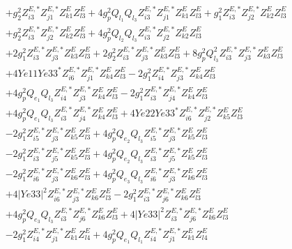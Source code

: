 \begin{align}
 &+g_{2}^{2} Z^{E,*}_{i 3} Z^{E,*}_{j 1} Z_{{k 1}}^{E} Z_{{l 3}}^{E} +4 g_{p}^{2} Q_{l_1} Q_{l_3} Z^{E,*}_{i 3} Z^{E,*}_{j 1} Z_{{k 1}}^{E} Z_{{l 3}}^{E} +g_{1}^{2} Z^{E,*}_{i 3} Z^{E,*}_{j 2} Z_{{k 2}}^{E} Z_{{l 3}}^{E} \nonumber \\ 
 &+g_{2}^{2} Z^{E,*}_{i 3} Z^{E,*}_{j 2} Z_{{k 2}}^{E} Z_{{l 3}}^{E} +4 g_{p}^{2} Q_{l_2} Q_{l_3} Z^{E,*}_{i 3} Z^{E,*}_{j 2} Z_{{k 2}}^{E} Z_{{l 3}}^{E} \nonumber \\ 
 &+2 g_{1}^{2} Z^{E,*}_{i 3} Z^{E,*}_{j 3} Z_{{k 3}}^{E} Z_{{l 3}}^{E} +2 g_{2}^{2} Z^{E,*}_{i 3} Z^{E,*}_{j 3} Z_{{k 3}}^{E} Z_{{l 3}}^{E} +8 g_{p}^{2} Q_{l_3}^{2} Z^{E,*}_{i 3} Z^{E,*}_{j 3} Z_{{k 3}}^{E} Z_{{l 3}}^{E} \nonumber \\ 
 &+4 Ye11 Ye33^* Z^{E,*}_{i 6} Z^{E,*}_{j 1} Z_{{k 4}}^{E} Z_{{l 3}}^{E} -2 g_{1}^{2} Z^{E,*}_{i 4} Z^{E,*}_{j 3} Z_{{k 4}}^{E} Z_{{l 3}}^{E} \nonumber \\ 
 &+4 g_{p}^{2} Q_{e_{1}} Q_{l_3} Z^{E,*}_{i 4} Z^{E,*}_{j 3} Z_{{k 4}}^{E} Z_{{l 3}}^{E} -2 g_{1}^{2} Z^{E,*}_{i 3} Z^{E,*}_{j 4} Z_{{k 4}}^{E} Z_{{l 3}}^{E} \nonumber \\ 
 &+4 g_{p}^{2} Q_{e_{1}} Q_{l_3} Z^{E,*}_{i 3} Z^{E,*}_{j 4} Z_{{k 4}}^{E} Z_{{l 3}}^{E} +4 Ye22 Ye33^* Z^{E,*}_{i 6} Z^{E,*}_{j 2} Z_{{k 5}}^{E} Z_{{l 3}}^{E} \nonumber \\ 
 &-2 g_{1}^{2} Z^{E,*}_{i 5} Z^{E,*}_{j 3} Z_{{k 5}}^{E} Z_{{l 3}}^{E} +4 g_{p}^{2} Q_{e_{2}} Q_{l_3} Z^{E,*}_{i 5} Z^{E,*}_{j 3} Z_{{k 5}}^{E} Z_{{l 3}}^{E} \nonumber \\ 
 &-2 g_{1}^{2} Z^{E,*}_{i 3} Z^{E,*}_{j 5} Z_{{k 5}}^{E} Z_{{l 3}}^{E} +4 g_{p}^{2} Q_{e_{2}} Q_{l_3} Z^{E,*}_{i 3} Z^{E,*}_{j 5} Z_{{k 5}}^{E} Z_{{l 3}}^{E} \nonumber \\ 
 &-2 g_{1}^{2} Z^{E,*}_{i 6} Z^{E,*}_{j 3} Z_{{k 6}}^{E} Z_{{l 3}}^{E} +4 g_{p}^{2} Q_{e_3} Q_{l_3} Z^{E,*}_{i 6} Z^{E,*}_{j 3} Z_{{k 6}}^{E} Z_{{l 3}}^{E} \nonumber \\ 
 &+4 |Ye33|^2 Z^{E,*}_{i 6} Z^{E,*}_{j 3} Z_{{k 6}}^{E} Z_{{l 3}}^{E} -2 g_{1}^{2} Z^{E,*}_{i 3} Z^{E,*}_{j 6} Z_{{k 6}}^{E} Z_{{l 3}}^{E} \nonumber \\ 
 &+4 g_{p}^{2} Q_{e_3} Q_{l_3} Z^{E,*}_{i 3} Z^{E,*}_{j 6} Z_{{k 6}}^{E} Z_{{l 3}}^{E} +4 |Ye33|^2 Z^{E,*}_{i 3} Z^{E,*}_{j 6} Z_{{k 6}}^{E} Z_{{l 3}}^{E} \nonumber \\ 
 &-2 g_{1}^{2} Z^{E,*}_{i 4} Z^{E,*}_{j 1} Z_{{k 1}}^{E} Z_{{l 4}}^{E} +4 g_{p}^{2} Q_{e_{1}} Q_{l_1} Z^{E,*}_{i 4} Z^{E,*}_{j 1} Z_{{k 1}}^{E} Z_{{l 4}}^{E} \nonumber \\ 

\end{align}
